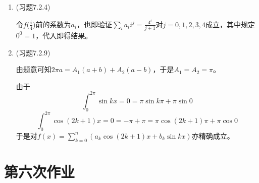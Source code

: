 \documentclass[a4paper,UTF8,fontset=windows]{ctexart}
\begin{document}
\begin{enumerate}
    \item (习题7.2.4)
    
    令$f\big(\frac{i}{4}\big)$前的系数为$a_i$，也即验证$\sum_ia_ii^j=\frac{4^i}{j+1}$对$j=0,1,2,3,4$成立，其中规定$0^0=1$，代入即得结果。
    
    \item (习题7.2.9)
    
    由题意可知$2\pi a= A_1(a+b)+A_2(a-b)$，于是$A_1=A_2=\pi$。
    
    由于
    $$\int_0^{2\pi}\sin kx=0=\pi\sin{k\pi}+\pi\sin 0$$
    $$\int_0^{2\pi}\cos(2k+1)x=0=-\pi+\pi=\pi\cos(2k+1)\pi+\pi\cos 0$$
    于是对$f(x)=\sum_{k=0}^n\left(a_k\cos(2k+1)x+b_k\sin kx\right)$亦精确成立。    
\end{enumerate}

\section{第六次作业}
\end{document}
